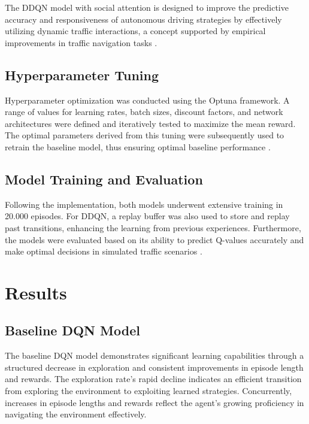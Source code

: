 \documentclass{article}
\begin{document}
The DDQN model with social attention is designed to improve the predictive accuracy and responsiveness of autonomous driving strategies by effectively utilizing dynamic traffic interactions, a concept supported by empirical improvements in traffic navigation tasks \citep{8500630, 9664628}.

\subsection{Hyperparameter Tuning}
Hyperparameter optimization was conducted using the Optuna framework. A range of values for learning rates, batch sizes, discount factors, and network architectures were defined and iteratively tested to maximize the mean reward. The optimal parameters derived from this tuning were subsequently used to retrain the baseline model, thus ensuring optimal baseline performance \citep{optuna_2019}.

\subsection{Model Training and Evaluation}
Following the implementation, both models underwent extensive training in 20.000 episodes. For DDQN, a replay buffer was also used to store and replay past transitions, enhancing the learning from previous experiences. Furthermore, the models were evaluated based on its ability to predict Q-values accurately and make optimal decisions in simulated traffic scenarios \citep{9664628}.

\section{Results}

\subsection{Baseline DQN Model}

The baseline DQN model demonstrates significant learning capabilities through a structured decrease in exploration and consistent improvements in episode length and rewards. The exploration rate's rapid decline indicates an efficient transition from exploring the environment to exploiting learned strategies. Concurrently, increases in episode lengths and rewards reflect the agent's growing proficiency in navigating the environment effectively.
\end{document}
